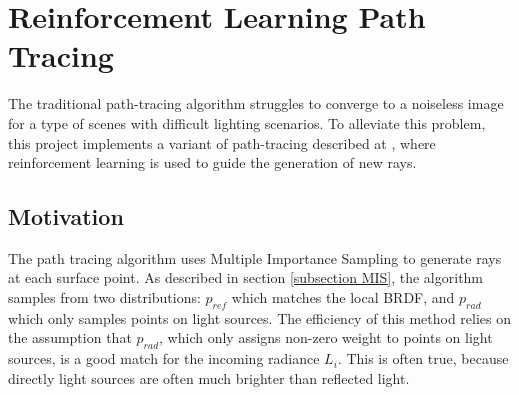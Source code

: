 \chapter{Reinforcement Learning Path Tracing}
The traditional path-tracing algorithm struggles to converge to a noiseless image for a type of scenes with difficult lighting scenarios. To alleviate this problem, this project implements a variant of path-tracing described at \cite{RLPT}, where reinforcement learning is used to guide the generation of new rays.

\section{Motivation}
The path tracing algorithm uses Multiple Importance Sampling to generate rays at each surface point. As described in section \ref{subsection MIS}, the algorithm samples from two distributions: $p_{ref}$ which matches the local BRDF, and $p_{rad}$ which only samples points on light sources. The efficiency of this method relies on the assumption that $p_{rad}$, which only assigns non-zero weight to points on light sources, is a good match for the incoming radiance $L_i$. This is often true, because directly light sources are often much brighter than reflected light.  
